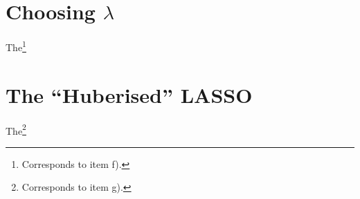 \documentclass[a4paper, 12pt]{article}
\begin{document}
\section{Choosing $\lambda$}
The\footnote{Corresponds to item f).}

\section{The ``Huberised'' LASSO}
The\footnote{Corresponds to item g).}
\end{document}
